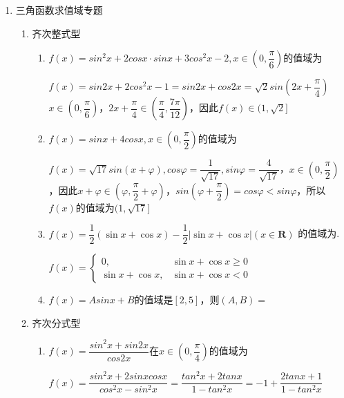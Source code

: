 \begin{enumerate}
\item 三角函数求值域专题
    \begin{enumerate}
        \item 齐次整式型 
        \begin{enumerate}
            \item $f(x) = sin^2x + 2cosx \cdot sinx + 3cos^2x - 2, x \in \left(0, \dfrac{\pi}{6}\right)$的值域为\blkda{$(1, \sqrt{2}]$} 
            \begin{jieda}
                $f(x) = sin2x + 2cos^2x -1 = sin2x + cos2x = \sqrt{2}sin\left(2x+\dfrac{\pi}{4}\right)$ \\
                $x \in \left(0, \dfrac{\pi}{6}\right)$，$2x+\dfrac{\pi}{4} \in \left(\dfrac{\pi}{4}, \dfrac{7\pi}{12}\right)$，因此$f(x) \in (1, \sqrt{2}]$
            \end{jieda}
            \item $f(x) = sinx + 4cosx, x \in \left(0, \dfrac{\pi}{2}\right)$的值域为\blkda{$\left(1, \sqrt{17}\right]$}
            \begin{jieda}
                $f(x) = \sqrt{17}sin(x+\varphi), cos\varphi = \dfrac{1}{\sqrt{17}}, sin\varphi = \dfrac{4}{\sqrt{17}}$，$x \in \left(0, \dfrac{\pi}{2}\right)$，因此$x+\varphi \in \left(\varphi, \dfrac{\pi}{2}+\varphi\right)$，$sin(\varphi + \dfrac{\pi}{2}) = cos\varphi < sin\varphi$，所以$f(x)$的值域为$(1, \sqrt{17}]$
            \end{jieda}
            \item $f\left( x\right)  = \dfrac{1}{2}\left( {\sin x + \cos x}\right)  - \dfrac{1}{2}\left| {\sin x + \cos x}\right| \left( {x \in  \mathbf{R}}\right)$ 的值域为\blkda{$[-\sqrt{2}, 0]$}.
            \begin{jieda}
                $f(x)=
                \left\{
                \begin{array}{ll}
                0, & \sin x + \cos x \geq 0 \\
                \sin x + \cos x, & \sin x + \cos x < 0
                \end{array}
                \right.$
            \end{jieda}
            \item $f(x) = Asinx + B$的值域是$[2, 5]$，则$(A, B) = $
        \end{enumerate}
        \item 齐次分式型
        \begin{enumerate}
            \item $f(x) = \dfrac{sin^2x + sin2x}{cos2x}$在$x \in \left(0, \dfrac{\pi}{4}\right)$的值域为
            \begin{jieda}
                $f(x) = \dfrac{sin^2x + 2sinxcosx}{cos^2x-sin^2x} = \dfrac{tan^2x+2tanx}{1-tan^2x} = -1 + \dfrac{2tanx + 1}{1-tan^2x}$


\end{jieda}
\end{enumerate}
\end{enumerate}
\end{enumerate}
